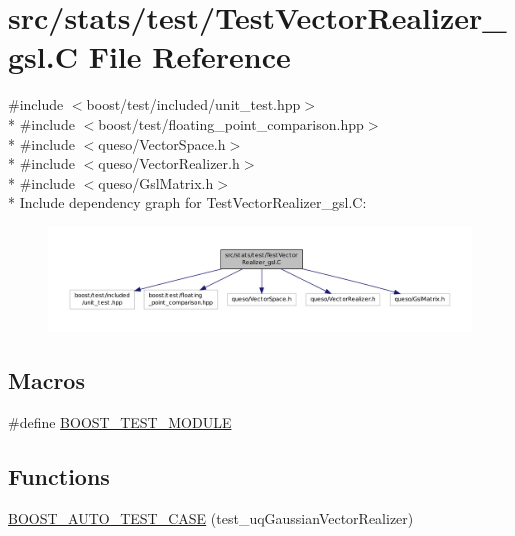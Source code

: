 \hypertarget{_test_vector_realizer__gsl_8_c}{\section{src/stats/test/\-Test\-Vector\-Realizer\-\_\-gsl.C File Reference}
\label{_test_vector_realizer__gsl_8_c}
}
{\ttfamily \#include $<$boost/test/included/unit\-\_\-test.\-hpp$>$}\\*
{\ttfamily \#include $<$boost/test/floating\-\_\-point\-\_\-comparison.\-hpp$>$}\\*
{\ttfamily \#include $<$queso/\-Vector\-Space.\-h$>$}\\*
{\ttfamily \#include $<$queso/\-Vector\-Realizer.\-h$>$}\\*
{\ttfamily \#include $<$queso/\-Gsl\-Matrix.\-h$>$}\\*
Include dependency graph for Test\-Vector\-Realizer\-\_\-gsl.\-C\-:
\nopagebreak
\begin{figure}[H]
\begin{center}
\leavevmode
\includegraphics[width=350pt]{_test_vector_realizer__gsl_8_c__incl}
\end{center}
\end{figure}
\subsection*{Macros}
\begin{DoxyCompactItemize}
\item 
\#define \hyperlink{_test_vector_realizer__gsl_8_c_a6b2a3852db8bb19ab6909bac01859985}{B\-O\-O\-S\-T\-\_\-\-T\-E\-S\-T\-\_\-\-M\-O\-D\-U\-L\-E}
\end{DoxyCompactItemize}
\subsection*{Functions}
\begin{DoxyCompactItemize}
\item 
\hyperlink{_test_vector_realizer__gsl_8_c_ab6231a858da916ab67fe192b7afc1be8}{B\-O\-O\-S\-T\-\_\-\-A\-U\-T\-O\-\_\-\-T\-E\-S\-T\-\_\-\-C\-A\-S\-E} (test\-\_\-uq\-Gaussian\-Vector\-Realizer)
\end{DoxyCompactItemize}


